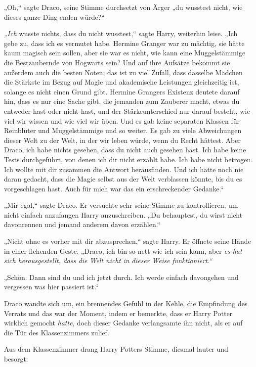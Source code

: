 {„Oh,“ sagte Draco, seine Stimme durchsetzt von Ärger „du wusstest nicht, wie dieses ganze Ding enden würde?“

\emph{„Ich} wusste nichts, dass du nicht wusstest,“ sagte Harry, weiterhin leise. „Ich gebe zu, dass ich es vermutet habe. Hermine Granger war zu mächtig, sie hätte kaum magisch sein sollen, aber sie war es nicht, wie kann eine Muggelstämmige die Bestzaubernde von Hogwarts sein? Und auf ihre Aufsätze bekommt sie außerdem auch die besten Noten; das ist zu viel Zufall, dass dasselbe Mädchen die Stärkste im Bezug auf Magie und akademische Leistungen gleichzeitig ist, solange es nicht einen Grund gibt. Hermine Grangers Existenz deutete darauf hin, dass es nur eine Sache gibt, die jemanden zum Zauberer macht, etwas du entweder hast oder nicht hast, und der Stärkeunterschied nur darauf besteht, wie viel wir wissen und wie viel wir üben. Und es gab keine separaten Klassen für Reinblüter und Muggelstämmige und so weiter. Es gab zu viele Abweichungen dieser Welt zu der Welt, in der wir leben würde, wenn du Recht hättest. Aber Draco, ich habe nichts gesehen, dass du nicht auch gesehen hast. Ich habe keine Tests durchgeführt, von denen ich dir nicht erzählt habe. Ich habe nicht betrogen. Ich wollte mit dir zusammen die Antwort herausfinden. Und ich hätte noch nie daran gedacht, dass die Magie selbst aus der Welt verblassen könnte, bis du es vorgeschlagen hast. Auch für mich war das ein erschreckender Gedanke.“

„Mir egal,“ sagte Draco. Er versuchte sehr seine Stimme zu kontrollieren, um nicht einfach anzufangen Harry anzuschreiben. „Du behauptest, du wirst nicht davonrennen und jemand anderem davon erzählen.“

„Nicht ohne es vorher mit dir abzusprechen,“ sagte Harry. Er öffnete seine Hände in einer flehenden Geste. „Draco, ich bin so nett wie ich sein kann, aber \emph{es hat sich herausgestellt, dass die Welt nicht in dieser Weise funktioniert.“}

„Schön. Dann sind du und ich jetzt durch. Ich werde einfach davongehen und vergessen was hier passiert ist.“

Draco wandte sich um, ein brennendes Gefühl in der Kehle, die Empfindung des Verrats und das war der Moment, indem er bemerkte, dass er Harry Potter wirklich gemocht \emph{hatte,} doch dieser Gedanke verlangsamte ihn nicht, als er auf die Tür des Klassenzimmers zulief.

Aus dem Klassenzimmer drang Harry Potters Stimme, diesmal lauter und besorgt:

}

